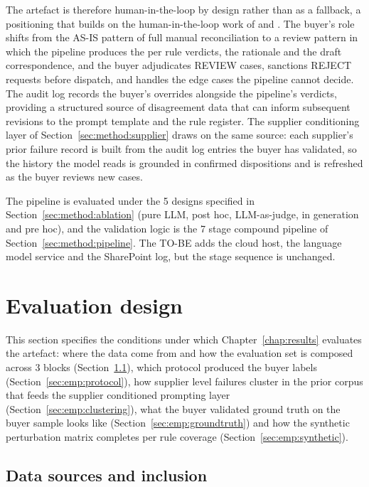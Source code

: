 The artefact is therefore human-in-the-loop by design rather than as a fallback, a positioning that builds on the human-in-the-loop work of \citet{amershi2019} and \citet{bansal2021}. The buyer's role shifts from the AS-IS pattern of full manual reconciliation to a review pattern in which the pipeline produces the per rule verdicts, the rationale and the draft correspondence, and the buyer adjudicates REVIEW cases, sanctions REJECT requests before dispatch, and handles the edge cases the pipeline cannot decide. The audit log records the buyer's overrides alongside the pipeline's verdicts, providing a structured source of disagreement data that can inform subsequent revisions to the prompt template and the rule register. The supplier conditioning layer of Section~\ref{sec:method:supplier} draws on the same source: each supplier's prior failure record is built from the audit log entries the buyer has validated, so the history the model reads is grounded in confirmed dispositions and is refreshed as the buyer reviews new cases.

The pipeline is evaluated under the 5 designs specified in Section~\ref{sec:method:ablation} (pure LLM, post hoc, LLM-as-judge, in generation and pre hoc), and the validation logic is the 7 stage compound pipeline of Section~\ref{sec:method:pipeline}. The TO-BE adds the cloud host, the language model service and the SharePoint log, but the stage sequence is unchanged.


\section{Evaluation design}
\label{sec:emp:eval}

This section specifies the conditions under which Chapter~\ref{chap:results} evaluates the artefact: where the data come from and how the evaluation set is composed across 3 blocks (Section~\ref{sec:emp:sources}), which protocol produced the buyer labels (Section~\ref{sec:emp:protocol}), how supplier level failures cluster in the prior corpus that feeds the supplier conditioned prompting layer (Section~\ref{sec:emp:clustering}), what the buyer validated ground truth on the buyer sample looks like (Section~\ref{sec:emp:groundtruth}) and how the synthetic perturbation matrix completes per rule coverage (Section~\ref{sec:emp:synthetic}).


\subsection{Data sources and inclusion}
\label{sec:emp:sources}

